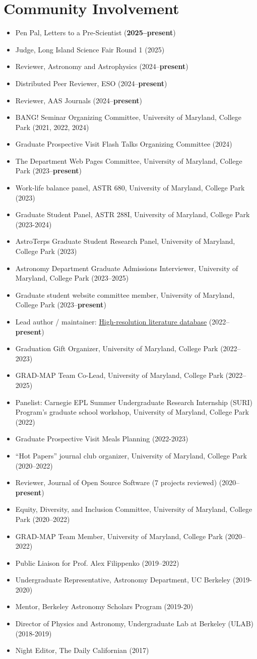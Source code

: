 \documentclass[letterpaper,10.5pt]{article}
\newcommand{\resumeItem}[2]{
  \item\small{
    \textbf{#1}{#2 \vspace{-2pt}}
  }
}
\newcommand{\resumeItemListStart}{\begin{itemize}}
\newcommand{\resumeItemListEnd}{\end{itemize}\vspace{-5pt}}
\newcommand{\shorterSection}[1]{\vspace{-10pt}\section{#1}}
\begin{document}
\shorterSection{Community Involvement}
\resumeItemListStart
\resumeItem{}{Pen Pal, Letters to a Pre-Scientist (\textbf{2025--present})}
\resumeItem{}{Judge, Long Island Science Fair Round 1 (2025)}
\resumeItem{}{Reviewer, Astronomy and Astrophysics (2024--\textbf{present})}
\resumeItem{}{Distributed Peer Reviewer, ESO (2024--\textbf{present})}
\resumeItem{}{Reviewer, AAS Journals (2024--\textbf{present})}
\resumeItem{}{BANG! Seminar Organizing Committee, University of Maryland, College Park (2021, 2022, 2024)}
\resumeItem{}{Graduate Prospective Visit Flash Talks Organizing Committee (2024)}
\resumeItem{}{The Department Web Pages Committee, University of Maryland, College Park (2023--\textbf{present})}
\resumeItem{}{Work-life balance panel, ASTR 680, University of Maryland, College Park (2023)}
\resumeItem{}{Graduate Student Panel, ASTR 288I, University of Maryland, College Park (2023-2024)}
\resumeItem{}{AstroTerps Graduate Student Research Panel, University of Maryland, College Park (2023)}
\resumeItem{}{Astronomy Department Graduate Admissions Interviewer, University of Maryland, College Park (2023--2025)}
\resumeItem{}{Graduate student website committee member, University of Maryland, College Park (2023--\textbf{present})}
\resumeItem{}{Lead author / maintainer: \href{https://www.arjunsavel.com/hires_papers.html}{High-resolution literature database} (2022--\textbf{present})}
\resumeItem{}{Graduation Gift Organizer, University of Maryland, College Park (2022--2023)}
\resumeItem{}{GRAD-MAP Team Co-Lead, University of Maryland, College Park (2022--2025)}
\resumeItem{}{Panelist: Carnegie EPL Summer Undergraduate Research Internship (SURI) Program’s graduate school workshop, University of Maryland, College Park (2022)}
\resumeItem{}{Graduate Prospective Visit Meals Planning (2022-2023)}
\resumeItem{}{``Hot Papers'' journal club organizer, University of Maryland, College Park (2020--2022)}
\resumeItem{}{Reviewer, Journal of Open Source Software (7 projects reviewed) (2020--\textbf{present})}
\resumeItem{}{Equity, Diversity, and Inclusion Committee, University of Maryland, College Park (2020--2022)}
\resumeItem{}{GRAD-MAP Team Member, University of Maryland, College Park (2020--2022)}
\resumeItem{}{Public Liaison for Prof. Alex Filippenko (2019--2022)}
\resumeItem{}{Undergraduate Representative, Astronomy Department, UC Berkeley (2019-2020)}
\resumeItem{}{Mentor, Berkeley Astronomy Scholars Program (2019-20)}
\resumeItem{}{Director of Physics and Astronomy, Undergraduate Lab at Berkeley (ULAB) (2018-2019)}
\resumeItem{}{Night Editor, The Daily Californian (2017)}
\resumeItemListEnd
\end{document}
